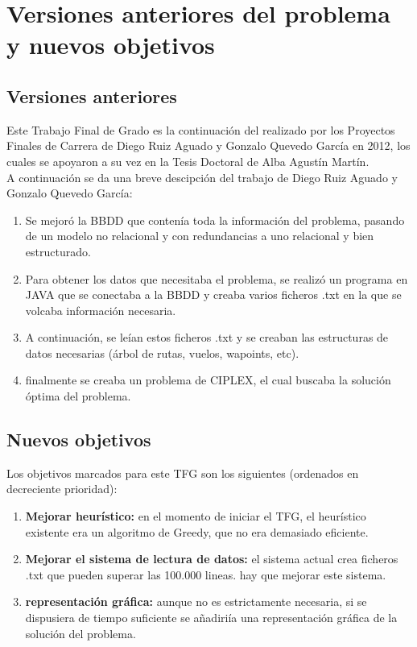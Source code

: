 \section{Versiones anteriores del problema y nuevos objetivos}

\subsection{Versiones anteriores}
Este Trabajo Final de Grado es la continuación del realizado por los Proyectos Finales de Carrera de Diego Ruiz Aguado y Gonzalo Quevedo García en 2012, los cuales se apoyaron a su vez en la Tesis Doctoral de Alba Agustín  Martín.\\


A continuación se da una breve descipción del trabajo de  Diego Ruiz Aguado y Gonzalo Quevedo García:
\begin{enumerate}
	\item Se mejoró la BBDD que contenía toda la información del problema, pasando de un modelo no relacional y con redundancias a uno relacional y bien estructurado.
	\item Para obtener los datos que necesitaba el problema, se realizó un programa en JAVA que se conectaba a la BBDD y creaba varios ficheros .txt en la que se volcaba información necesaria.
	\item A continuación, se leían estos ficheros .txt y se creaban las estructuras de datos necesarias (árbol de rutas, vuelos, wapoints, etc).
	\item finalmente se creaba un problema de CIPLEX, el cual buscaba la solución óptima del problema.
\end{enumerate}

\subsection{Nuevos objetivos}
Los objetivos marcados para este TFG son los siguientes (ordenados en decreciente prioridad):
\begin{enumerate}
	\item \textbf{Mejorar heurístico: } en el momento de iniciar el TFG, el heurístico existente era un algoritmo de Greedy, que no era demasiado eficiente.
	\item \textbf{Mejorar el sistema de lectura de datos:} el sistema actual crea ficheros .txt que pueden superar las 100.000 lineas. hay que mejorar este sistema.
	\item \textbf{representación gráfica: }aunque no es estrictamente necesaria, si se dispusiera de tiempo suficiente se añadiriía una representación gráfica de la solución del problema. 	 
\end{enumerate}
